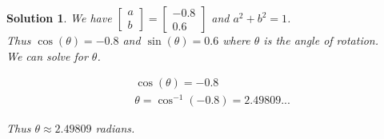 \documentclass{article}
\newtheorem*{solution}{Solution}
\begin{document}
\begin{solution}
We have $\begin{bmatrix} a \\ b \end{bmatrix} = \begin{bmatrix} -0.8 \\ 0.6 \end{bmatrix}$ and $a^2 + b^2 = 1$. \\

Thus $\cos(\theta) = -0.8$ and $\sin(\theta) = 0.6$ where $\theta$ is the angle of rotation. \\

We can solve for $\theta$.

\begin{align*}
& \cos(\theta) = -0.8 \\
& \theta = \cos^{-1}(-0.8) = 2.49809... 
\end{align*}

Thus $\theta \approx 2.49809$ radians.
\end{solution}
\end{document}
